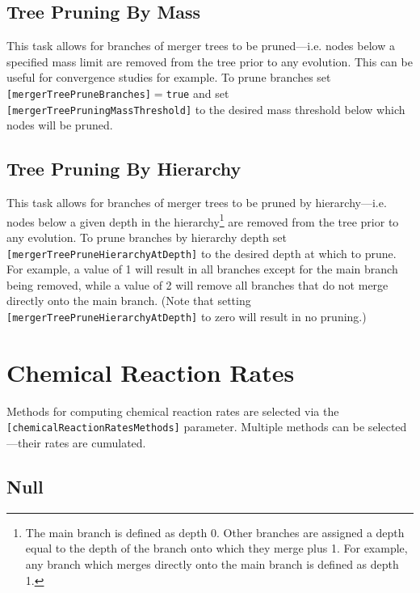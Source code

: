 \subsection{Tree Pruning By Mass}

This task allows for branches of merger trees to be pruned---i.e. nodes below a specified mass limit are removed from the tree prior to any evolution. This can be useful for convergence studies for example. To prune branches set {\tt [mergerTreePruneBranches]}$=${\tt true} and set {\tt [mergerTreePruningMassThreshold]} to the desired mass threshold below which nodes will be pruned.

\subsection{Tree Pruning By Hierarchy}

This task allows for branches of merger trees to be pruned by hierarchy---i.e. nodes below a given depth in the hierarchy\footnote{The main branch is defined as depth 0. Other branches are assigned a depth equal to the depth of the branch onto which they merge plus 1. For example, any branch which merges directly onto the main branch is defined as depth 1.} are removed from the tree prior to any evolution.  To prune branches by hierarchy depth set {\tt [mergerTreePruneHierarchyAtDepth]} to the desired depth at which to prune. For example, a value of 1 will result in all branches except for the main branch being removed, while a value of 2 will remove all branches that do not merge directly onto the main branch. (Note that setting {\tt [mergerTreePruneHierarchyAtDepth]} to zero will result in no pruning.)

\section{Chemical Reaction Rates}\label{sec:ChemicalReactionRates}

Methods for computing chemical reaction rates are selected via the {\tt [chemicalReactionRatesMethods]} parameter. Multiple methods can be selected---their rates are cumulated.

\subsection{Null}

